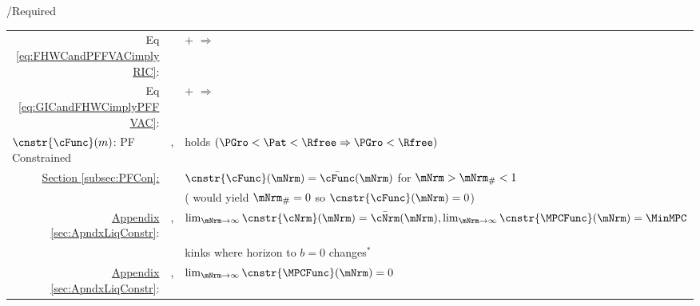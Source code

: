 \documentclass[\econtexRoot/BufferStockTheory]{subfiles}
\begin{document}
\begin{verbatimwrite}{\TableDir/Required}
\begin{table}
{\begin{tabular}{|l|l|l|}
    \\ \multicolumn{1}{|r|}{Eq \eqref{eq:FHWCandPFFVACimplyRIC}:}                                                                              &                                         & {\PFFVAC}+{\FHWC} $\Rightarrow$ {\RIC}         
    \\ \multicolumn{1}{|r|}{{Eq \eqref{eq:GICandFHWCimplyPFFVAC}}:}                                                                              &                                         & {\GICRaw}+{\FHWC} $\Rightarrow$ {\PFFVAC}         
    \\ \hline\hline \multicolumn{1}{|l|}{$\cnstr{\cFunc}(m)$: PF Constrained}                                              & \cncl{\GICRaw}, \RIC                    & {\FHWC} holds $(\PGro < \Pat < \Rfree \Rightarrow \PGro < \Rfree)$
    \\
\multicolumn{1}{|r|}{\href{https://\owner.github.io/BufferStockTheory\#PF-Constrained-Solution}{Section \ref{subsec:PFCon}:}}                &                                         & $\cnstr{\cFunc}(\mNrm)=\bar{\cFunc}(\mNrm)$ for $\mNrm > \mNrm_{\#} < 1$
    \\                                                                                                                        &                                         & (\cncl{\RIC} would yield $\mNrm_{\#}=0$ so $\cnstr{\cFunc}(\mNrm)=0$)
    \\ \cline{2-3}  \multicolumn{1}{|r|}{\href{https://\owner.github.io/BufferStockTheory\#ApndxLiqConstr}{Appendix \ref{sec:ApndxLiqConstr}}:} & \GICRaw,\RIC                            & $\lim_{\mNrm \rightarrow \infty} \cnstr{\cNrm}(\mNrm)=\bar{\cNrm}(\mNrm), \lim_{\mNrm \rightarrow \infty} \cnstr{\MPCFunc}(\mNrm)=\MinMPC$                                                                                                                                                                       
    \\                                                                                                                        &                                         & kinks where horizon to $b=0$ changes$^{\ast}$
    \\ \cline{2-3}\multicolumn{1}{|r|}{\href{https://\owner.github.io/BufferStockTheory\#ApndxLiqConstr}{Appendix \ref{sec:ApndxLiqConstr}}:}  & \GICRaw,\cncl{\RIC}                     & $\lim_{\mNrm \rightarrow \infty}  \cnstr{\MPCFunc}(\mNrm)=0$

\end{tabular}}
\end{table}
\end{verbatimwrite}
\end{document}
